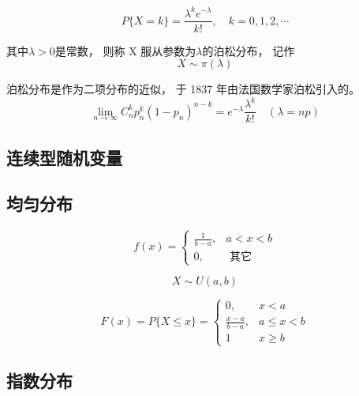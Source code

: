 \begin{equation}
{P}\{{X}={k}\}=\frac{\lambda^{k} {e}^{-\lambda}}{{k} !}, \quad {k}={0}, {1}, {2}, \cdots
\end{equation}

其中$\lambda > 0$是常数， 则称 X 服从参数为$\lambda$的泊松分布， 记作
\begin{equation} X \sim \pi(\lambda) \end{equation}


\begin{theorem}[泊松定理]
    \label{thm:Poission}
泊松分布是作为二项分布的近似， 于 1837 年由法国数学家泊松引入的。
\begin{equation}
\lim _{n \rightarrow \infty} C_{n}^{k} p_{n}^{k}\left(1-p_{n}\right)^{n-k}=e^{-\lambda} \frac{\lambda^{k}}{k !}\quad (\lambda = np)
\end{equation}
\end{theorem}

\subsection{连续型随机变量}

\subsection{均匀分布}

\begin{equation}
f(x)=\left\{\begin{array}{cc}
\frac{1}{b-a}, & a<x<b \\
0, & \text { 其它 }
\end{array}\right.
\end{equation}

\begin{equation} X \sim U(a,b) \end{equation}

\begin{equation}
F(x)=P\{X \leq x\}=\left\{\begin{array}{ll}
0, & x<a \\
\frac{x-a}{b-a}, & a \leq x<b \\
1 & x \geq b
\end{array}\right.
\end{equation}

\subsection{指数分布}

